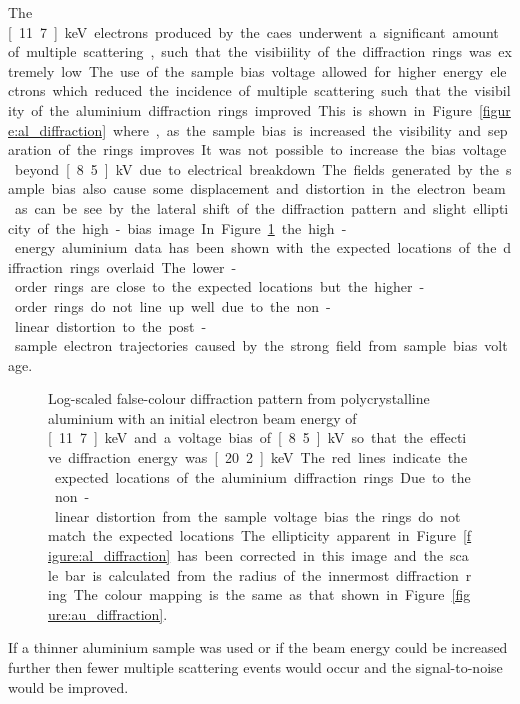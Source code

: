 The \unit[11.7]{keV} electrons produced by the \gls{caes} underwent a significant amount of multiple scattering, such that the visibiility of the diffraction rings was extremely low.
The use of the sample bias voltage allowed for higher energy electrons which reduced the incidence of multiple scattering such that the visibility of the aluminium diffraction rings improved.
This is shown in Figure~\ref{figure:al_diffraction} where, as the sample bias is increased the visibility and separation of the rings improves.
It was not possible to increase the bias voltage beyond \unit[8.5]{kV} due to electrical breakdown.
The fields generated by the sample bias also cause some displacement and distortion in the electron beam as can be see by the lateral shift of the diffraction pattern and slight ellipticity of the high-bias image.

In Figure~\ref{figure:al_diffraction_rings} the high-energy aluminium data has been shown with the expected locations of the diffraction rings overlaid.
The lower-order rings are close to the expected locations but the higher-order rings do not line up well due to the non-linear distortion to the post-sample electron trajectories caused by the strong field from sample bias voltage.

\begin{figure}
    \center
    
    \caption[Diffraction pattern from aluminium demonstrating the distortion from the voltage bias.]{Log-scaled false-colour diffraction pattern from polycrystalline aluminium with an initial electron beam energy of \unit[11.7]{keV} and a voltage bias of \unit[8.5]{kV} so that the effective diffraction energy was \unit[20.2]{keV}. The red lines indicate the expected locations of the aluminium diffraction rings. Due to the non-linear distortion from the sample voltage bias the rings do not match the expected locations. The ellipticity apparent in Figure~\ref{figure:al_diffraction} has been corrected in this image and the scale bar is calculated from the radius of the innermost diffraction ring. The colour mapping is the same as that shown in Figure~\ref{figure:au_diffraction}.}
    \label{figure:al_diffraction_rings}
\end{figure}

If a thinner aluminium sample was used or if the beam energy could be increased further then fewer multiple scattering events would occur and the signal-to-noise would be improved.

